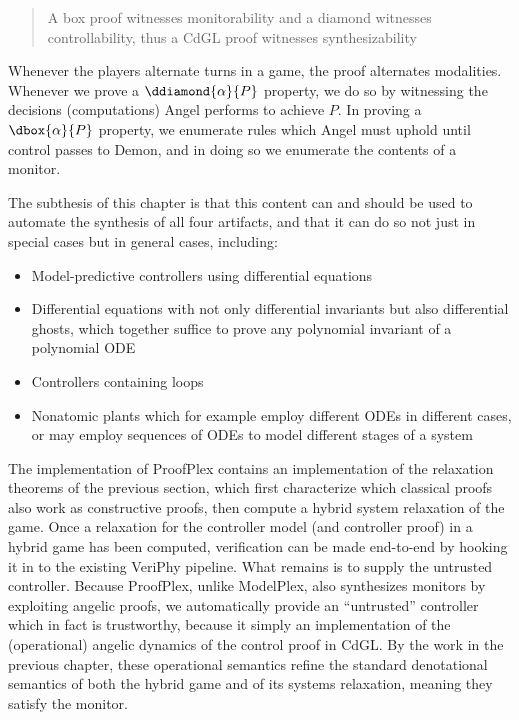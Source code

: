 \documentclass[12pt]{cmuthesis}
\theoremstyle{definition}
\theoremstyle{remark}
\newcommand{\CdGL}{\textsf{CdGL}\xspace}
\newcommand{\ProofPlex}{ProofPlex\xspace}
\newcommand{\VeriPhy}{VeriPhy\xspace}
\newcommand{\ModelPlex}{ModelPlex\xspace}
\begin{document}
\begin{framed}
  \begin{quote}
A box proof witnesses monitorability and a diamond witnesses controllability, thus a \CdGL proof witnesses synthesizability
  \end{quote}
\end{framed}

Whenever the players alternate turns in a game, the proof alternates modalities.
Whenever we prove a $\ddiamond{\alpha}{P}$ property, we do so by witnessing the decisions (computations) Angel performs to achieve $P$.
In proving a $\dbox{\alpha}{P}$ property, we enumerate rules which Angel must uphold until control passes to Demon, and in doing so we enumerate the contents of a monitor.

The subthesis of this chapter is that this content can and should be used to automate the synthesis of all four artifacts, and that it can do so not just in special cases but in general cases, including:
\begin{itemize}
\item Model-predictive controllers using differential equations
\item Differential equations with not only differential invariants but also differential ghosts, which together suffice to prove any polynomial invariant of a polynomial ODE
\item Controllers containing loops
\item Nonatomic plants which for example employ different ODEs in different cases, or may employ sequences of ODEs to model different stages of a system
\end{itemize}

The implementation of \ProofPlex contains an implementation of the relaxation theorems of the previous section, which first characterize which classical proofs also work as constructive proofs, then compute a hybrid system relaxation of the game.
Once a relaxation for the controller model (and controller proof) in a hybrid game has been computed, verification can be made end-to-end by hooking it in to the existing \VeriPhy pipeline.
What remains is to supply the untrusted controller.
Because \ProofPlex, unlike \ModelPlex, also synthesizes monitors by exploiting angelic proofs, we automatically provide an ``untrusted'' controller which in fact is trustworthy, because it simply an implementation of the (operational) angelic dynamics of the control proof in \CdGL. By the work in the previous chapter, these operational semantics refine the standard denotational semantics of both the hybrid game and of its systems relaxation, meaning they satisfy the monitor.
\end{document}
